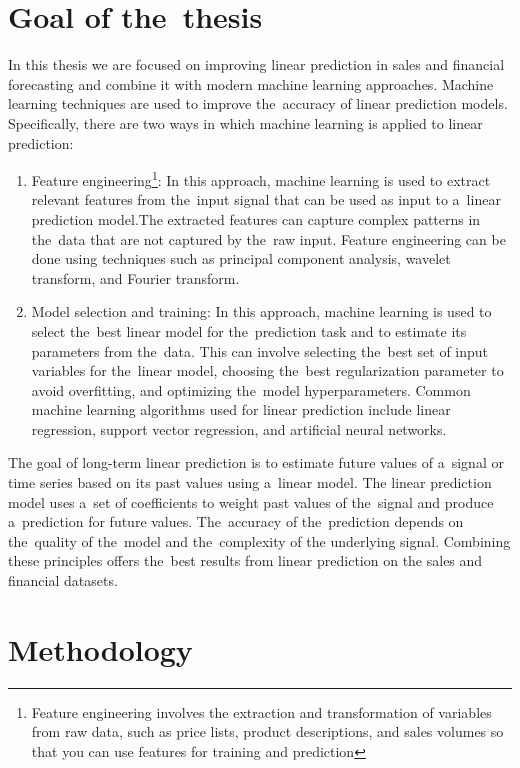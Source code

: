 \chapter{Goal of the~thesis}\label{sec:goal}
In this thesis we are focused on improving linear prediction in sales and financial forecasting and combine it with
modern machine learning approaches. Machine learning techniques are used to improve the~accuracy of linear
prediction models. Specifically, there are two ways in which machine learning is applied to linear prediction:
\begin{enumerate}
    \item Feature engineering\footnote{Feature engineering involves the extraction and transformation of
    variables from raw data, such as price lists, product descriptions, and sales volumes so that you
    can use features for training and prediction}: In this approach, machine learning is used to extract
    relevant features from the~input
    signal that can be used as input to a~linear prediction model.The extracted features can capture complex patterns
    in the~data that are not captured by the~raw input. Feature engineering can be done using techniques such as
    principal component analysis, wavelet transform, and Fourier transform.
    \item Model selection and training: In this approach, machine learning is used to select the~best linear
    model for the~prediction task and to estimate its parameters from the~data. This can involve selecting the~best
    set of input variables for the~linear model, choosing the~best regularization parameter to avoid overfitting, and
    optimizing the~model hyperparameters. Common machine learning algorithms used for linear prediction include linear
    regression, support vector regression, and artificial neural networks.
\end{enumerate}
The goal of long-term linear prediction is to estimate future values of a~signal or time series based on its past
values using a~linear model.
The linear prediction model uses a~set of coefficients to weight past values of the~signal and produce a~prediction for
future values. The~accuracy of the~prediction depends on the~quality of the~model and the~complexity of the
underlying signal. Combining these principles offers the~best results from linear prediction on the
sales and financial datasets.
\chapter{Methodology}\label{sec:methodology}

